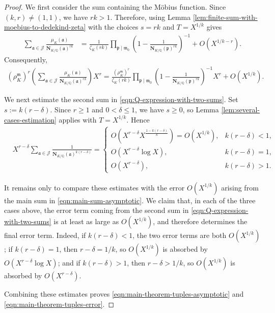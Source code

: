 \documentclass[11pt, reqno]{amsart}
\numberwithin{equation}{section}
\newcommand{\Q}{\mathbb{Q}}
\newcommand{\Nrm}[2]{\mathbf{N}_{#1}(#2)}
\theoremstyle{definition}
\begin{document}
\begin{proof}
We first consider the sum containing the M\"obius function.
Since $(k,r)\neq(1,1)$, we have $rk>1$. Therefore, using
Lemma \ref{lem:finite-sum-with-moebius-to-dedekind-zeta} with the choices $s=rk$ and $T=X^{1/k}$ gives
\begin{align}
\sum_{\mathfrak{a}\in\mathcal{J}}
\frac{\mu_K(\mathfrak{a})}
{\Nrm{K/\Q}{\mathfrak{a}}^{rk}}
&=
\frac{1}{\zeta_K(rk)}
\prod_{\mathfrak{p}\mid\mathfrak{m}_0}
\left(
1-\frac{1}
{\Nrm{K/\Q}{\mathfrak{p}}^{rk}}
\right)^{-1}
+
O\left(X^{1/k - r}\right).
\end{align}
Consequently,
\begin{align}
\left(\rho_K^{\mathfrak{m}}\right)^r
\left(
\sum_{\mathfrak{a}\in\mathcal{J}}
\frac{\mu_K(\mathfrak{a})}
{\Nrm{K/\Q}{\mathfrak{a}}^{rk}}
\right)X^r =
\frac{\left(\rho_K^{\mathfrak{m}}\right)^r}
{\zeta_K(rk)}
\prod_{\mathfrak{p}\mid\mathfrak{m}_0}
\left(
1-\frac{1}
{\Nrm{K/\Q}{\mathfrak{p}}^{rk}}
\right)^{-1} X^r + O\left(X^{1/k}\right).
\label{eqn:main-sum-asymptotic}
\end{align}

We next estimate the second sum in \eqref{eqn:Q-expression-with-two-sums}. Set $s:=k(r-\delta)$. Since $r\geq1$ and $0<\delta\leq1$, we have $s\geq0$, so
Lemma \ref{lem:several-cases-estimation} applies with
$T=X^{1/k}$. Hence
\begin{align}
&X^{r-\delta}
\sum_{\mathfrak{a}\in\mathcal{J}}
\frac{1}
{\Nrm{K/\Q}{\mathfrak{a}}^{k(r-\delta)}}
=
\begin{cases}
\displaystyle
O\left(
X^{r-\delta}
X^{\frac{1-k(r-\delta)}{k}}
\right)
=
O\left(X^{1/k}\right),
&
k(r-\delta)<1,
\\[10pt]
\displaystyle
O\left(
X^{r-\delta}\log X
\right),
&
k(r-\delta)=1,
\\[10pt]
\displaystyle
O\left(
X^{r-\delta}
\right),
&
k(r-\delta)>1.
\end{cases}
\label{eqn:secondary-error-cases}
\end{align}


It remains only to compare these estimates with the error
$O(X^{1/k})$ arising from the main sum in
\eqref{eqn:main-sum-asymptotic}. We claim that, in each of the three
cases above, the error term coming from the second sum in
\eqref{eqn:Q-expression-with-two-sums} is at least as large as
$O(X^{1/k})$, and therefore determines the final error term. Indeed,
if $k(r-\delta)<1$, the two error terms are both $O(X^{1/k})$; if
$k(r-\delta)=1$, then $r-\delta=1/k$, so
$O(X^{1/k})$ is absorbed by
$O(X^{r-\delta}\log X)$; and if $k(r-\delta)>1$, then
$r-\delta>1/k$, so $O(X^{1/k})$ is absorbed by
$O(X^{r-\delta})$.

Combining these estimates proves \eqref{eqn:main-theorem-tuples-asymptotic} and \eqref{eqn:main-theorem-tuples-error}.
\end{proof}
\end{document}
